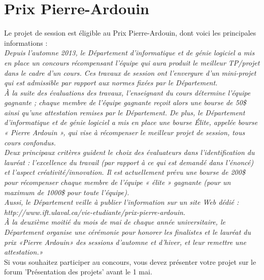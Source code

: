 \documentclass[12pt]{article}
\newcommand{\state}{\noindent}
\begin{document}
\pagebreak

\section*{Prix Pierre-Ardouin}

\state
Le projet de session est éligible au Prix Pierre-Ardouin, dont voici les principales informations : \\

\state
\textit{Depuis l'automne 2013, le Département d'informatique et de génie logiciel a mis en place un concours récompensant l'équipe qui aura produit le meilleur TP/projet dans le cadre d'un cours. Ces travaux de session ont l'envergure d'un mini-projet qui est admissible par rapport aux normes fixées par le Département.} \\

\state
\textit{À la suite des évaluations des travaux, l'enseignant du cours détermine l'équipe gagnante ; chaque membre de l'équipe gagnante reçoit alors une bourse de 50\$ ainsi qu'une attestation remises par le Département.
De plus, le Département d'informatique et de génie logiciel a mis en place une bourse Élite, appelée bourse « Pierre Ardouin », qui vise à récompenser le meilleur projet de session, tous cours confondus.} \\

\state
\textit{Deux principaux critères guident le choix des évaluateurs dans l'identification du lauréat : l'excellence du travail (par rapport à ce qui est demandé dans l'énoncé) et l'aspect créativité/innovation. Il est actuellement prévu une bourse de 200\$ pour récompenser chaque membre de l'équipe « élite » gagnante (pour un maximum de 1000\$ pour toute l'équipe).} \\

\state
\textit{Aussi, le Département veille à publier l'information sur un site Web dédié : http://www.ift.ulaval.ca/vie-etudiante/prix-pierre-ardouin.} \\

\state
\textit{À la deuxième moitié du mois de mai de chaque année universitaire, le Département organise une cérémonie pour honorer les finalistes et le lauréat du prix «Pierre Ardouin» des sessions d'automne et d'hiver, et leur remettre une attestation.»} \\

\state
Si vous souhaitez participer au concours, vous devez présenter votre projet sur
le forum 'Présentation des projets' avant le 1 mai.
\end{document}
